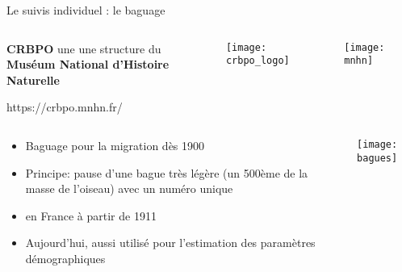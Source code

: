 \message{ !name(cours_DIE_ONIRIS_Suivi_populations_oiseaux.tex)}\documentclass[10pt]{beamer}
\begin{document}
\begin{frame}{Le suivis individuel : le baguage}
  \begin{columns}[c]
    \begin{column}[c]{0.6\textwidth}
      \textbf{CRBPO} une une structure du \\\textbf{Muséum National d'Histoire
      Naturelle}\\
      \begin{tiny}
        https://crbpo.mnhn.fr/
      \end{tiny}
    \end{column}
    \begin{column}[c]{0.3\textwidth}
      \texttt{[image: crbpo\_logo]}
    \end{column}
    \begin{column}[c]{0.1\textwidth}
      \texttt{[image: mnhn]}
    \end{column}
  \end{columns}
  \begin{columns}[c]
    \begin{column}[c]{0.6\textwidth}
     \begin{itemize}[<+->]
  \item Baguage pour la migration dès 1900
  \item Principe: pause d'une bague très légère (un 500ème de la masse
    de l'oiseau) avec un numéro unique
  \item en France à partir de 1911
  \item Aujourd'hui, aussi utilisé pour l'estimation des paramètres démographiques
  \end{itemize}
    \end{column}
    \begin{column}[c]{0.4\textwidth}
      \begin{center}
        \texttt{[image: bagues]}
      \end{center}
    \end{column}
  \end{columns}

\end{frame}
\end{document}
